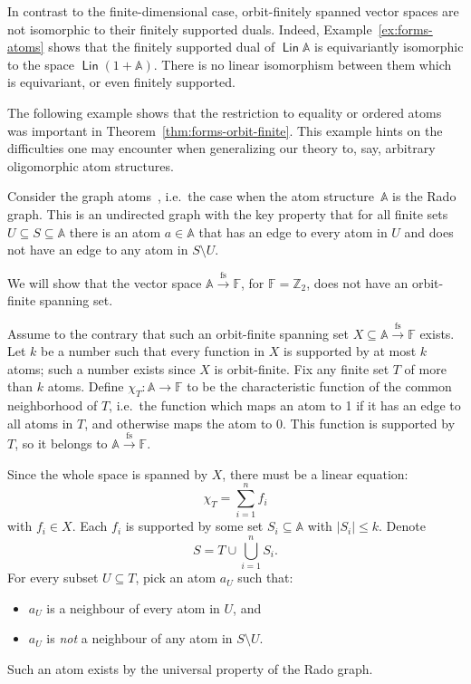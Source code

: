\documentclass[10pt,a4paper]{amsart}
\numberwithin{equation}{section}
\newcommand{\Int}{{\mathbb Z}}
\newcommand{\atoms}{\mathbb A}
\DeclareMathOperator{\lin}{\mathsf{Lin}}
\newcommand{\field}{\mathbb F}
\newcommand{\finsup}{\stackrel{\mathrm{fs}}{\to}}
\newcommand{\forms}[1]{#1 \finsup \field}
\begin{document}
In contrast to the finite-dimensional case, orbit-finitely spanned vector spaces are not isomorphic to their finitely supported duals. Indeed, Example~\ref{ex:forms-atoms} shows that
    the finitely supported dual of $\lin \atoms$ is equivariantly isomorphic to the space $\lin (1+ \atoms)$.
    There is no linear isomorphism between them which is equivariant, or even finitely supported.

The following example shows that the restriction to equality or ordered atoms was important in 
Theorem~\ref{thm:forms-orbit-finite}. This example hints on the difficulties one may encounter when generalizing 
our theory to, say, arbitrary oligomorphic atom structures.

\begin{example}
    \label{ex:counter-example-graph-atoms}
    Consider the graph atoms~\cite[Section 7.3.1]{bojanczyk_slightly2018}, i.e.~the case when the atom structure~$\atoms$ is the Rado graph. This is an undirected graph with the key property that for all finite sets $U\subseteq S\subseteq\atoms$ there is an atom $a\in\atoms$ that has an edge to every atom in $U$ and does not have an edge to any atom in $S\setminus U$.
    
We will show that the vector space $\forms \atoms$, for $\field=\Int_2$, does not have an orbit-finite spanning set.
    
Assume to the contrary that such an orbit-finite spanning set $X\subseteq \forms\atoms$ exists. Let $k$ be a number such that every function in $X$ is supported by at most $k$ atoms; such a number exists since $X$ is orbit-finite. Fix any finite set $T$ of more than $k$ atoms. Define $\chi_T : \atoms  \to \field $ to be the characteristic function of the common neighborhood of $T$, i.e.~the function which maps an atom to 1 if it has an edge to all atoms in $T$, and otherwise maps the atom to 0. This function is supported by $T$, so it belongs to $\forms \atoms$. 
    
Since the whole space is spanned by $X$, there must be a linear equation:
    \begin{equation}\label{eq:chigraph}
    	\chi_T = \sum_{i=1}^nf_i
    \end{equation}
with $f_i\in X$. Each $f_i$ is supported by some set $S_i\subseteq\atoms$ with $|S_i|\leq k$. Denote
\[
	S = T\cup\bigcup_{i=1}^nS_i.
\]
For every subset $U\subseteq T$, pick an atom $a_U$ such that:
\begin{itemize}
\item $a_U$ is a neighbour of every atom in $U$, and
\item $a_U$ is {\em not} a neighbour of any atom in $S\setminus U$.
\end{itemize}
Such an atom exists by the universal property of the Rado graph. 


\end{example}
\end{document}
